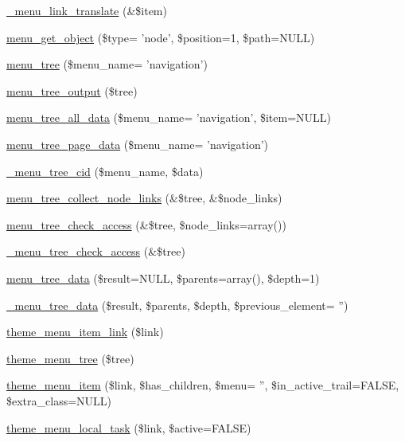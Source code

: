 \begin{CompactItemize}
\item 
\hyperlink{group__menu_g360d727a77cd570860dc7b8382cdba05}{\_\-menu\_\-link\_\-translate} (\&\$item)
\item 
\hyperlink{group__menu_g8b1c8825ae7b6ae31b50cadaa1f7c920}{menu\_\-get\_\-object} (\$type= 'node', \$position=1, \$path=NULL)
\item 
\hyperlink{group__menu_ga43c3a496679a1cc16d02d76d0422752}{menu\_\-tree} (\$menu\_\-name= 'navigation')
\item 
\hyperlink{group__menu_g2ef0691992a9df71eb3455ba774053e7}{menu\_\-tree\_\-output} (\$tree)
\item 
\hyperlink{group__menu_ga4b0957cc1027dae4f4093b1b884227d}{menu\_\-tree\_\-all\_\-data} (\$menu\_\-name= 'navigation', \$item=NULL)
\item 
\hyperlink{group__menu_g84e2ecf44d5b72159370c74c910e93e3}{menu\_\-tree\_\-page\_\-data} (\$menu\_\-name= 'navigation')
\item 
\hyperlink{group__menu_g165ee791b785630b578b0f737812b8b7}{\_\-menu\_\-tree\_\-cid} (\$menu\_\-name, \$data)
\item 
\hyperlink{group__menu_g0c9a63fbbdf8496828f1f80d37459475}{menu\_\-tree\_\-collect\_\-node\_\-links} (\&\$tree, \&\$node\_\-links)
\item 
\hyperlink{group__menu_g6374db210d96026fb70431def083a7a5}{menu\_\-tree\_\-check\_\-access} (\&\$tree, \$node\_\-links=array())
\item 
\hyperlink{group__menu_gd59ba7ae64f452408201f82f8cb7dc25}{\_\-menu\_\-tree\_\-check\_\-access} (\&\$tree)
\item 
\hyperlink{group__menu_gbf77de9e90a7f2c4f889a74cde1ee3e4}{menu\_\-tree\_\-data} (\$result=NULL, \$parents=array(), \$depth=1)
\item 
\hyperlink{group__menu_g70d13ba2c42c6b0da4b0ef68bcc7ed0d}{\_\-menu\_\-tree\_\-data} (\$result, \$parents, \$depth, \$previous\_\-element= '')
\item 
\hyperlink{group__themeable_g77f59240b3aead5df8a777e4f69961b5}{theme\_\-menu\_\-item\_\-link} (\$link)
\item 
\hyperlink{group__themeable_g88e49eaff39c8953c4ac72f4d2752ab1}{theme\_\-menu\_\-tree} (\$tree)
\item 
\hyperlink{group__themeable_gcb681206cbcb99f33b633da5c9d843c2}{theme\_\-menu\_\-item} (\$link, \$has\_\-children, \$menu= '', \$in\_\-active\_\-trail=FALSE, \$extra\_\-class=NULL)
\item 
\hyperlink{group__themeable_gea1a8b949266dc4264f73d64bb0a8ecd}{theme\_\-menu\_\-local\_\-task} (\$link, \$active=FALSE)

\end{CompactItemize}

